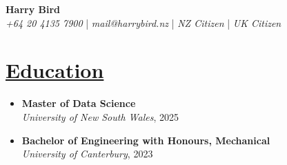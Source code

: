 \documentclass[a4paper,10pt]{article}
\begin{document}
\begin{center}
    {\Huge \textbf{Harry Bird}} \\
    \vspace{0.25cm}
    \textit{+64 20 4135 7900} |
    \textit{mail@harrybird.nz} |
    \textit{NZ Citizen} |
    \textit{UK Citizen} \\
\end{center}

\section*{\uline{Education}}
\begin{itemize}
    \item \textbf{Master of Data Science} \\
    \textit{University of New South Wales}, 2025
    \item \textbf{Bachelor of Engineering with Honours, Mechanical} \\
    \textit{University of Canterbury}, 2023
\end{itemize}
\end{document}
